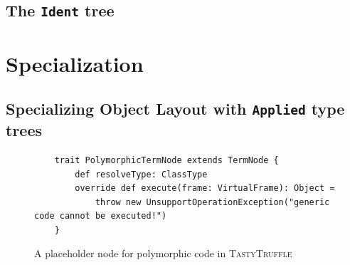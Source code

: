 \subsection{The \texttt{Ident} tree}

\section{Specialization}
\label{implementation:specialization}

\subsection{Specializing Object Layout with \texttt{Applied} type trees}

\begin{figure}[!htb]
	\begin{verbatim}
	trait PolymorphicTermNode extends TermNode {
		def resolveType: ClassType 
		override def execute(frame: VirtualFrame): Object = 
			throw new UnsupportOperationException("generic code cannot be executed!")
	}
	\end{verbatim}
	\caption{A placeholder node for polymorphic code in \textsc{TastyTruffle}}
\end{figure}

